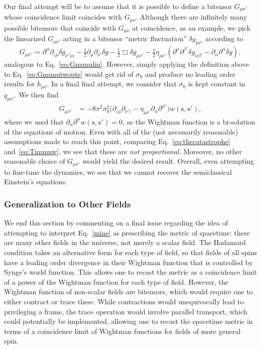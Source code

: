 \documentclass[letterpaper,12pt,titlepage,oneside,final]{book}
\newcommand{\mf}{\mathsf}%
\begin{document}
Our final attempt will be to assume that it is possible to define a bitensor $G_{\mu\nu'}$ whose coincidence limit coincides with $G_{\mu\nu}$. Although there are infinitely many possible bitensors that coincide with $G_{\mu\nu}$ at coincidence, as an example, we pick the linearized $G_{\mu\nu'}$ acting in a bitensor ``metric fluctuation'' $\delta g_{\mu\nu'}$ according to
\begin{equation}
    G_{\mu\nu'} \coloneqq \partial^\alpha \partial_{(\mu} \delta g_{\nu')\alpha} - \tfrac{1}{2} \partial_\mu \partial_{\nu'} \delta g - \tfrac{1}{2} \Box \delta g_{\mu\nu'}  - \tfrac{1}{2}\eta_{\mu\nu'}(\partial^\alpha \partial^{\beta'}\delta g_{\alpha\beta'} - \partial_\alpha\partial^\alpha \delta g), 
\end{equation}
analogous to Eq.~\eqref{eq:Gmunulin}. However, simply applying the definition above to Eq.~\eqref{eq:Gmunutwopts} would get rid of $\sigma_0$ and produce no leading order results for $h_{\mu\nu}$. In a final final attempt, we consider that $\sigma_0$ is kept constant in $q_{\mu\nu'}$. We then find
\begin{align}\label{eq:thecatastrophe}
    G_{\mu\nu'}  &= -8 \pi^2 \sigma_0^2 \big(\partial_{(\mu}\partial_{\nu')} - \eta_{\mu\nu'}\partial_\alpha \partial^{\alpha'}\big) w(\mf x, \mf x'),
\end{align}
where we used that $\partial_\alpha\partial^\alpha w(\mf x,\mf x') = 0$, as the Wightman function is a bi-solution of the equations of motion. Even with all of the (not necessarily reasonable) assumptions made to reach this point, comparing Eq.~\eqref{eq:thecatastrophe} and~\eqref{eq:Tmunuw}, we see that these are \textit{not proportional}. Moreover, no other reasonable choice of $G_{\mu\nu'}$ would yield the desired result. Overall, even attempting to fine-tune the dynamics, we see that we cannot recover the semiclassical Einstein's equations.

\subsubsection*{Generalization to Other Fields}

We end this section by commenting on a final issue regarding the idea of attempting to interpret Eq.~\eqref{mine} as prescribing the metric of spacetime: there are many other fields in the universe, not merely a scalar field. The Hadamard condition takes an alternative form for each type of field, so that fields of all spins have a leading order divergence in their Wightman function that is controlled by Synge's world function. This allows one to recast the metric as a coincidence limit of a power of the Wightman function for each type of field. However, the Wightman function of non-scalar fields are bitensors, which would require one to either contract or trace these. While contractions would unequivocally lead to privileging a frame, the trace operation would involve parallel transport, which could potentially be implemented, allowing one to recast the spacetime metric in terms of a coincidence limit of Wightman functions for fields of more general spin.
\end{document}
